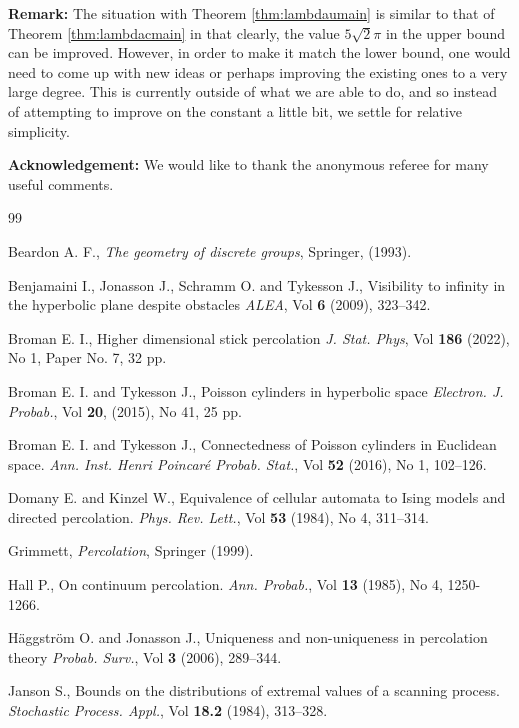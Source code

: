 \documentclass[a4paper,12pt]{article}
\begin{document}
\noindent
{\bf Remark:} The situation with Theorem \ref{thm:lambdaumain} is similar to that 
of Theorem \ref{thm:lambdacmain} in that clearly, the value 
$5\sqrt{2}\pi$ in the 
upper bound can be improved. However, in order to make it match the lower bound, 
one would need to come up with new ideas or perhaps improving the existing ones 
to a very large degree. This is currently outside of what we are able to 
do, and so instead of attempting to improve on the constant a little bit, 
we settle for relative simplicity.

\medskip

\noindent
{\bf Acknowledgement:} We would like to thank the anonymous referee for many useful comments.

\begin{thebibliography}{99}

 Beardon A. F., {\em The geometry of discrete groups}, Springer, (1993).

Benjamaini I., Jonasson J., Schramm O. and Tykesson J.,
Visibility to infinity in the hyperbolic plane despite obstacles
{\em ALEA},  Vol {\bf 6} (2009), 323--342. 


Broman E. I., 
Higher dimensional stick percolation
{\em J. Stat. Phys}, Vol {\bf 186} (2022), 
No 1, Paper No. 7, 32 pp.


 Broman E. I. and  Tykesson J., Poisson cylinders in hyperbolic space
{\em Electron. J. Probab.}, Vol {\bf 20}, (2015), 
No 41, 25 pp.

 Broman E. I. and  Tykesson J., 
Connectedness of Poisson cylinders in Euclidean space. 
{\em Ann. Inst. Henri Poincar\'e Probab. Stat.}, Vol {\bf 52} (2016), 
No 1, 102--126.

  Domany E. and Kinzel W., Equivalence of cellular 
automata to Ising models and directed percolation. 
{\em Phys. Rev. Lett.}, Vol {\bf 53} (1984), No 4, 311--314.

 Grimmett, {\em Percolation}, Springer (1999).

 Hall P., On continuum percolation. 
{\em Ann. Probab.}, Vol {\bf 13} (1985), No 4, 1250-1266.

 Häggström O. and Jonasson J., 
Uniqueness and non-uniqueness in percolation theory
{\em Probab. Surv.}, Vol {\bf 3} (2006), 289–344.

 Janson S., Bounds on the distributions of extremal
values of a scanning process. {\em Stochastic Process. Appl.},
Vol {\bf 18.2} (1984), 313–328. 


\end{thebibliography}
\end{document}
